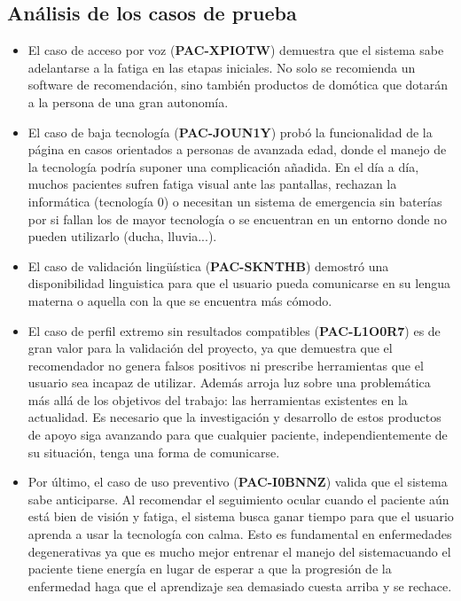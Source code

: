 \subsection{Análisis de los casos de prueba}

\begin{itemize}
    	\item El caso de acceso por voz (\textbf{PAC-XPIOTW}) demuestra que el sistema sabe adelantarse a la fatiga en las etapas iniciales. No solo se recomienda un software de recomendación, sino también productos de domótica que dotarán a la persona de una gran autonomía. 
    
    	\item El caso de baja tecnología (\textbf{PAC-JOUN1Y}) probó la funcionalidad de la página en casos orientados a personas de avanzada edad, donde el manejo de la tecnología podría suponer una complicación añadida. En el día a día, muchos pacientes sufren fatiga visual ante las 			pantallas, rechazan la informática (tecnología 0) o necesitan un sistema de emergencia sin baterías por si fallan los de mayor tecnología o se encuentran en un entorno donde no pueden utilizarlo (ducha, lluvia...). 
    
    	\item El caso de validación lingüística (\textbf{PAC-SKNTHB}) demostró una disponibilidad linguistica para que el usuario pueda comunicarse en su lengua materna o aquella con la que se encuentra más cómodo.

	\item El caso de perfil extremo sin resultados compatibles  (\textbf{PAC-L1O0R7}) es de gran valor para la validación del 	proyecto, ya que demuestra que el recomendador no genera falsos positivos ni prescribe herramientas que el usuario sea incapaz de utilizar. 					Además arroja luz sobre una problemática más allá de los objetivos del trabajo: las herramientas existentes en la actualidad. Es necesario que la investigación y desarrollo de estos productos de apoyo siga avanzando para que cualquier paciente, independientemente de su 				situación, tenga una forma de comunicarse.

	\item Por último, el caso de uso preventivo (\textbf{PAC-I0BNNZ})  valida que el sistema sabe anticiparse. Al recomendar el seguimiento ocular cuando el paciente aún está bien de visión y fatiga, el sistema busca ganar tiempo para que el usuario aprenda a usar la tecnología con 			calma. Esto es fundamental en enfermedades degenerativas ya que es mucho mejor entrenar el manejo del sistemacuando el paciente tiene energía en lugar de esperar a que la progresión de la enfermedad haga que el aprendizaje sea demasiado cuesta arriba y se rechace.
\end{itemize}

